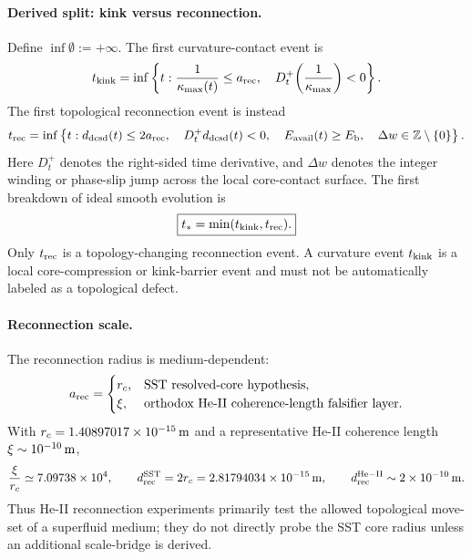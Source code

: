 \paragraph{Derived split: kink versus reconnection.}
Define $\inf\emptyset:=+\infty$. The first curvature-contact event is
\begin{equation}
    t_{\rm kink}
    =
    \inf\left\{
    t:
    \frac{1}{\kappa_{\max}(t)}\le a_{\rm rec},
    \quad
    D_t^+\!\left(\frac{1}{\kappa_{\max}}\right)<0
    \right\}.
    \label{eq:sst_t_kink}
\end{equation}
The first topological reconnection event is instead
\begin{equation}
    t_{\rm rec}
    =
    \inf\left\{
    t:
    d_{\rm dcsd}(t)\le 2a_{\rm rec},
    \quad
    D_t^+d_{\rm dcsd}(t)<0,
    \quad
    E_{\rm avail}(t)\ge E_{\rm b},
    \quad
    \Delta w\in\mathbb Z\setminus\{0\}
    \right\}.
    \label{eq:sst_t_rec}
\end{equation}
Here $D_t^+$ denotes the right-sided time derivative, and $\Delta w$ denotes the integer winding or phase-slip jump across the local core-contact surface. The first breakdown of ideal smooth evolution is
\begin{equation}
    \boxed{
    t_\ast=\min(t_{\rm kink},t_{\rm rec}).
    }
    \label{eq:sst_first_hitting_time}
\end{equation}
Only $t_{\rm rec}$ is a topology-changing reconnection event. A curvature event $t_{\rm kink}$ is a local core-compression or kink-barrier event and must not be automatically labeled as a topological defect.

\paragraph{Reconnection scale.}
The reconnection radius is medium-dependent:
\begin{equation}
    a_{\rm rec}
    =
    \begin{cases}
        r_c, & \text{SST resolved-core hypothesis},\\
        \xi, & \text{orthodox He-II coherence-length falsifier layer}.
    \end{cases}
    \label{eq:sst_reconnection_scale}
\end{equation}
With $r_c=1.40897017\times10^{-15}\,{\rm m}$ and a representative He-II coherence length $\xi\sim10^{-10}\,{\rm m}$,
\begin{equation}
    \frac{\xi}{r_c}
    \simeq
    7.09738\times10^4,
    \qquad
    d_{\rm rec}^{\rm SST}=2r_c=2.81794034\times10^{-15}\,{\rm m},
    \qquad
    d_{\rm rec}^{\rm He-II}\sim2\times10^{-10}\,{\rm m}.
    \label{eq:sst_heii_core_scale_mismatch}
\end{equation}
Thus He-II reconnection experiments primarily test the allowed topological move-set of a superfluid medium; they do not directly probe the SST core radius unless an additional scale-bridge is derived.

